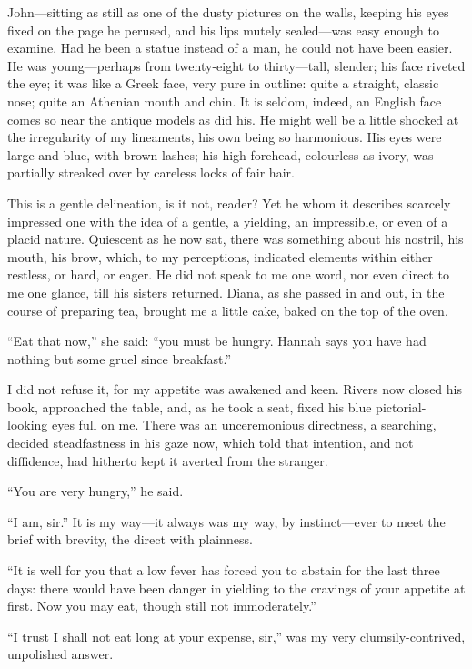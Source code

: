 \Mr{} \St{} John---sitting as still as one of the dusty pictures on the
walls, keeping his eyes fixed on the page he perused, and his lips
mutely sealed---was easy enough to examine. Had he been a statue
instead of a man, he could not have been easier. He was young---perhaps
from twenty-eight to thirty---tall, slender; his face riveted the eye;
it was like a Greek face, very pure in outline: quite a straight,
classic nose; quite an Athenian mouth and chin. It is seldom, indeed,
an English face comes so near the antique models as did his. He might
well be a little shocked at the irregularity of my lineaments, his own
being so harmonious. His eyes were large and blue, with brown lashes;
his high forehead, colourless as ivory, was partially streaked over by
careless locks of fair hair.

This is a gentle delineation, is it not, reader? Yet he whom it
describes scarcely impressed one with the idea of a gentle, a yielding,
an impressible, or even of a placid nature. Quiescent as he now sat,
there was something about his nostril, his mouth, his brow, which, to my
perceptions, indicated elements within either restless, or hard, or
eager. He did not speak to me one word, nor even direct to me one
glance, till his sisters returned. Diana, as she passed in and out, in
the course of preparing tea, brought me a little cake, baked on the top
of the oven.

\enquote{Eat that now,} she said: \enquote{you must be hungry. Hannah
	says you have had nothing but some gruel since breakfast.}

I did not refuse it, for my appetite was awakened and keen. \Mr{} Rivers
now closed his book, approached the table, and, as he took a seat, fixed
his blue pictorial-looking eyes full on me. There was an unceremonious
directness, a searching, decided steadfastness in his gaze now, which
told that intention, and not diffidence, had hitherto kept it averted
from the stranger.

\enquote{You are very hungry,} he said.

\enquote{I am, sir.} It is my way---it always was my way, by
instinct---ever to meet the brief with brevity, the direct with
plainness.

\enquote{It is well for you that a low fever has forced you to abstain
	for the last three days: there would have been danger in yielding to the
	cravings of your appetite at first. Now you may eat, though still not
	immoderately.}

\enquote{I trust I shall not eat long at your expense, sir,} was my very
clumsily-contrived, unpolished answer.

